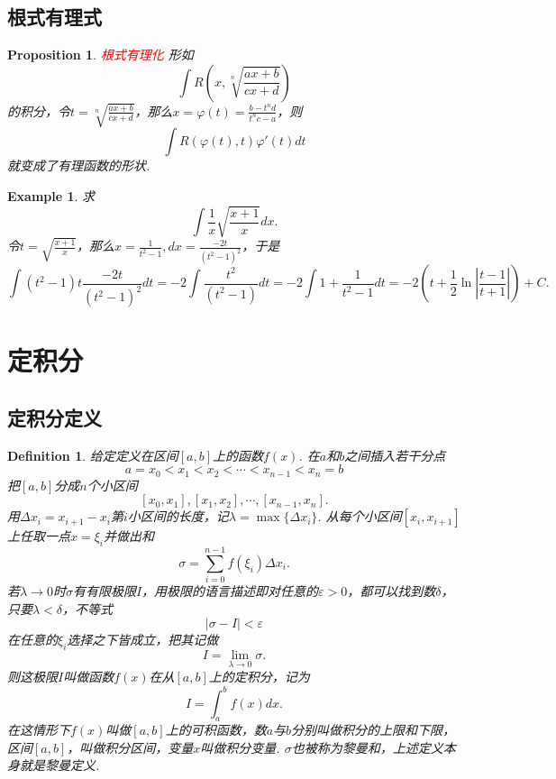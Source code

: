\documentclass{article}
\newtheorem{proposition}[theorem]{Proposition}
\newtheorem{example}[theorem]{Example}
\newtheorem{definition}[theorem]{Definition}
\newcommand{\redt}[1]{\textcolor{red}{#1}}
\begin{document}
\subsection{根式有理式}

\begin{proposition}
\rm \redt{根式有理化} 形如
$$
\int R(x,\sqrt[n]{\frac{ax+b}{cx+d}})
$$
的积分，令$t = \sqrt[n]{\frac{ax+b}{cx+d}}$，那么$x = \varphi(t) = \frac{b-t^nd}{t^nc -a}$，则
$$
\int R(\varphi(t),t)\varphi'(t)dt
$$
就变成了有理函数的形状. 
\end{proposition}

\begin{example}
\rm 求
$$
\int \frac{1}{x} \sqrt{\frac{x+1}{x}}dx.
$$
令$t = \sqrt{\frac{x+1}{x}}$，那么$x=\frac{1}{t^2-1}, dx = \frac{-2t}{(t^2-1)^2}$，于是
$$
\int (t^2 - 1) t \frac{-2t}{(t^2-1)^2} dt = -2\int \frac{t^2}{(t^2-1)}dt = -2 \int 1  + \frac{1}{t^2-1}dt = -2(t  + \frac{1}{2}\ln \left| \frac{t-1}{t+1} \right|) + C. 
$$
\end{example}

\newpage
\section{定积分}

\subsection{定积分定义}

\begin{definition}
\rm 给定定义在区间$[a,b]$上的函数$f(x)$. 在$a$和$b$之间插入若干分点
$$
a = x_0 < x_1 <x_2 < \cdots < x_{n-1} < x_n = b
$$
把$[a,b]$分成$n$个小区间
$$
[x_0,x_1],[x_1,x_2],\cdots,[x_{n-1},x_n].
$$
用$\Delta x_i = x_{i+1}-x_i$第$i$小区间的长度，记$\lambda = \max{\{\Delta x_i\}}$. 从每个小区间$[x_i,x_{i+1}]$上任取一点$x=\xi_i$并做出和
$$
\sigma = \sum\limits_{i=0}^{n-1}f(\xi_i)\Delta x_i.
$$
若$\lambda \rightarrow 0$时$\sigma$有有限极限$I$，用极限的语言描述即对任意的$\varepsilon > 0$，都可以找到数$\delta$，只要$\lambda < \delta$，不等式
$$
|\sigma - I| < \varepsilon
$$
在任意的$\xi_i$选择之下皆成立，把其记做
$$
I = \lim\limits_{\lambda \rightarrow 0} \sigma.
$$
则这极限$I$叫做函数$f(x)$在从$[a,b]$上的{\color{red}定积分}，记为
$$
I = \int_a^b f(x)dx.
$$
在这情形下$f(x)$叫做$[a,b]$上的{\color{red}可积函数}，数$a$与$b$分别叫做积分的{\color{red}上限}和{\color{red}下限}，区间$[a,b]$，叫做{\color{red}积分区间}，变量$x$叫做{\color{red}积分变量}. $\sigma$也被称为{\color{red}黎曼和}，上述定义本身就是{\color{red}黎曼定义}.
\end{definition}
\end{document}
